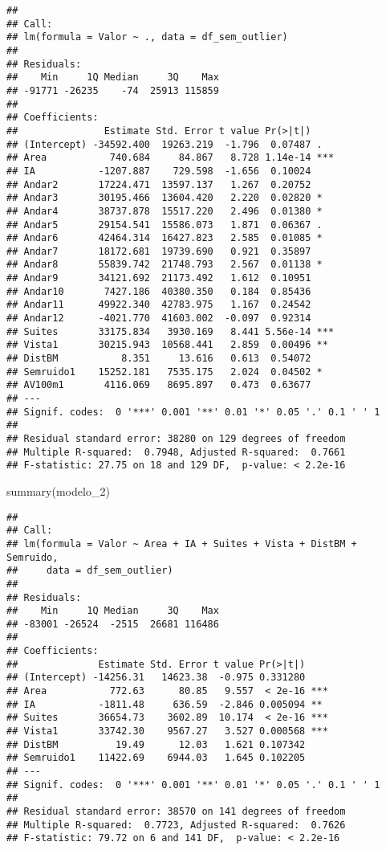 \documentclass[
]{article}
\newenvironment{Shaded}{\begin{snugshade}}{\end{snugshade}}
\newcommand{\FunctionTok}[1]{\textcolor[rgb]{0.00,0.00,0.00}{#1}}
\newcommand{\NormalTok}[1]{#1}
\begin{document}
\begin{verbatim}
## 
## Call:
## lm(formula = Valor ~ ., data = df_sem_outlier)
## 
## Residuals:
##    Min     1Q Median     3Q    Max 
## -91771 -26235    -74  25913 115859 
## 
## Coefficients:
##               Estimate Std. Error t value Pr(>|t|)    
## (Intercept) -34592.400  19263.219  -1.796  0.07487 .  
## Area           740.684     84.867   8.728 1.14e-14 ***
## IA           -1207.887    729.598  -1.656  0.10024    
## Andar2       17224.471  13597.137   1.267  0.20752    
## Andar3       30195.466  13604.420   2.220  0.02820 *  
## Andar4       38737.878  15517.220   2.496  0.01380 *  
## Andar5       29154.541  15586.073   1.871  0.06367 .  
## Andar6       42464.314  16427.823   2.585  0.01085 *  
## Andar7       18172.681  19739.690   0.921  0.35897    
## Andar8       55839.742  21748.793   2.567  0.01138 *  
## Andar9       34121.692  21173.492   1.612  0.10951    
## Andar10       7427.186  40380.350   0.184  0.85436    
## Andar11      49922.340  42783.975   1.167  0.24542    
## Andar12      -4021.770  41603.002  -0.097  0.92314    
## Suites       33175.834   3930.169   8.441 5.56e-14 ***
## Vista1       30215.943  10568.441   2.859  0.00496 ** 
## DistBM           8.351     13.616   0.613  0.54072    
## Semruido1    15252.181   7535.175   2.024  0.04502 *  
## AV100m1       4116.069   8695.897   0.473  0.63677    
## ---
## Signif. codes:  0 '***' 0.001 '**' 0.01 '*' 0.05 '.' 0.1 ' ' 1
## 
## Residual standard error: 38280 on 129 degrees of freedom
## Multiple R-squared:  0.7948, Adjusted R-squared:  0.7661 
## F-statistic: 27.75 on 18 and 129 DF,  p-value: < 2.2e-16
\end{verbatim}

\begin{Shaded}
\begin{Highlighting}[]
\FunctionTok{summary}\NormalTok{(modelo\_2)}
\end{Highlighting}
\end{Shaded}

\begin{verbatim}
## 
## Call:
## lm(formula = Valor ~ Area + IA + Suites + Vista + DistBM + Semruido, 
##     data = df_sem_outlier)
## 
## Residuals:
##    Min     1Q Median     3Q    Max 
## -83001 -26524  -2515  26681 116486 
## 
## Coefficients:
##              Estimate Std. Error t value Pr(>|t|)    
## (Intercept) -14256.31   14623.38  -0.975 0.331280    
## Area           772.63      80.85   9.557  < 2e-16 ***
## IA           -1811.48     636.59  -2.846 0.005094 ** 
## Suites       36654.73    3602.89  10.174  < 2e-16 ***
## Vista1       33742.30    9567.27   3.527 0.000568 ***
## DistBM          19.49      12.03   1.621 0.107342    
## Semruido1    11422.69    6944.03   1.645 0.102205    
## ---
## Signif. codes:  0 '***' 0.001 '**' 0.01 '*' 0.05 '.' 0.1 ' ' 1
## 
## Residual standard error: 38570 on 141 degrees of freedom
## Multiple R-squared:  0.7723, Adjusted R-squared:  0.7626 
## F-statistic: 79.72 on 6 and 141 DF,  p-value: < 2.2e-16
\end{verbatim}
\end{document}
